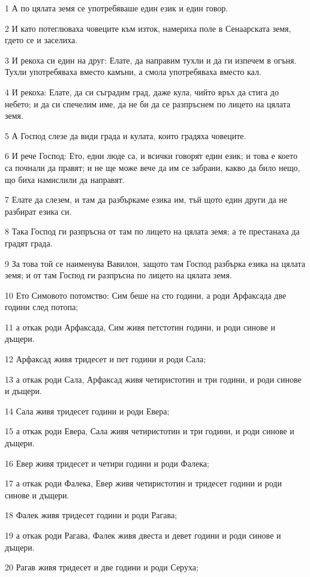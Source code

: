 \par 1 А по цялата земя се употребяваше един език и един говор.
\par 2 И като потеглюваха човеците към изток, намериха поле в Сенаарската земя, гдето се и заселиха.
\par 3 И рекоха си един на друг: Елате, да направим тухли и да ги изпечем в огъня. Тухли употребяваха вместо камъни, а смола употребяваха вместо кал.
\par 4 И рекоха: Елате, да си съградим град, даже кула, чийто връх да стига до небето; и да си спечелим име, да не би да се разпръснем по лицето на цялата земя.
\par 5 А Господ слезе да види града и кулата, които градяха човеците.
\par 6 И рече Господ: Ето, едни люде са, и всички говорят един език; и това е което са почнали да правят; и не ще може вече да им се забрани, какво да било нещо, що биха намислили да направят.
\par 7 Елате да слезем, и там да разбъркаме езика им, тъй щото един други да не разбират езика си.
\par 8 Така Господ ги разпръсна от там по лицето на цялата земя; а те престанаха да градят града.
\par 9 За това той се наименува Вавилон, защото там Господ разбърка езика на цялата земя; и от там Господ ги разпръсна по лицето на цялата земя.
\par 10 Ето Симовото потомство: Сим беше на сто години, а роди Арфаксада две години след потопа;
\par 11 а откак роди Арфаксада, Сим живя петстотин години, и роди синове и дъщери.
\par 12 Арфаксад живя тридесет и пет години и роди Сала;
\par 13 а откак роди Сала, Арфаксад живя четиристотин и три години, и роди синове и дъщери.
\par 14 Сала живя тридесет години и роди Евера;
\par 15 а откак роди Евера, Сала живя четиристотин и три години, и роди синове и дъщери.
\par 16 Евер живя тридесет и четири години и роди Фалека;
\par 17 а откак роди Фалека, Евер живя четиристотин и тридесет години и роди синове и дъщери.
\par 18 Фалек живя тридесет години и роди Рагава;
\par 19 а откак роди Рагава, Фалек живя двеста и девет години и роди синове и дъщери.
\par 20 Рагав живя тридесет и две години и роди Серуха;
